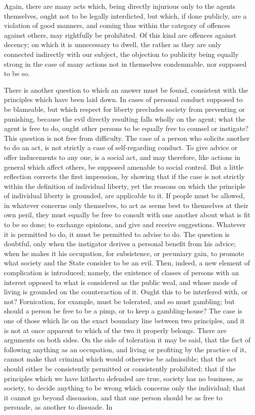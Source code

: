 \documentclass[12pt]{report}
\begin{document}
Again, there are many acts which, being directly injurious only to the agents themselves, ought not to be legally interdicted, but which, if done publicly, are a violation of good manners, and coming thus within the category of offences against others, may rightfully be prohibited. Of this kind are offences against decency; on which it is unnecessary to dwell, the rather as they are only connected indirectly with our subject, the objection to publicity being equally strong in the case of many actions not in themselves condemnable, nor supposed to be so.

There is another question to which an answer must be found, consistent with the principles which have been laid down. In cases of personal conduct supposed to be blameable, but which respect for liberty precludes society from preventing or punishing, because the evil directly resulting falls wholly on the agent; what the agent is free to do, ought other persons to be equally free to counsel or instigate? This question is not free from difficulty. The case of a person who solicits another to do an act, is not strictly a case of self-regarding conduct. To give advice or offer inducements to any one, is a social act, and may therefore, like actions in general which affect others, be supposed amenable to social control. But a little reflection corrects the first impression, by showing that if the case is not strictly within the definition of individual liberty, yet the reasons on which the principle of individual liberty is grounded, are applicable to it. If people must be allowed, in whatever concerns only themselves, to act as seems best to themselves at their own peril, they must equally be free to consult with one another about what is fit to be so done; to exchange opinions, and give and receive suggestions. Whatever it is permitted to do, it must be permitted to advise to do. The question is doubtful, only when the instigator derives a personal benefit from his advice; when he makes it his occupation, for subsistence, or pecuniary gain, to promote what society and the State consider to be an evil. Then, indeed, a new element of complication is introduced; namely, the existence of classes of persons with an interest opposed to what is considered as the public weal, and whose mode of living is grounded on the counteraction of it. Ought this to be interfered with, or not? Fornication, for example, must be tolerated, and so must gambling; but should a person be free to be a pimp, or to keep a gambling-house? The case is one of those which lie on the exact boundary line between two principles, and it is not at once apparent to which of the two it properly belongs. There are arguments on both sides. On the side of toleration it may be said, that the fact of following anything as an occupation, and living or profiting by the practice of it, cannot make that criminal which would otherwise be admissible; that the act should either be consistently permitted or consistently prohibited; that if the principles which we have hitherto defended are true, society has no business, as society, to decide anything to be wrong which concerns only the individual; that it cannot go beyond dissuasion, and that one person should be as free to persuade, as another to dissuade. In 
\end{document}
